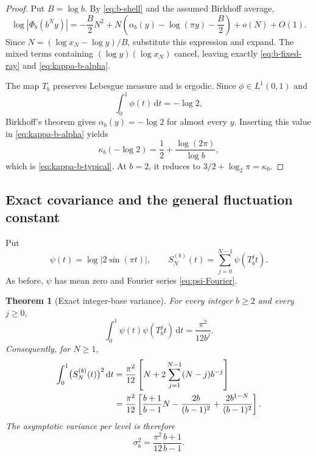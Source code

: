 \documentclass[11pt,oneside]{article}
\numberwithin{equation}{section}
\newtheorem{theorem}{Theorem}[section]
\theoremstyle{definition}
\theoremstyle{remark}
\newcommand{\dd}{\,\mathrm d}
\begin{document}
\begin{proof}
Put \(B=\log b\).  By \eqref{eq:b-shell} and the assumed Birkhoff average,
\[
 \log|\Phi_b(b^Ny)|
 =-\frac B2N^2
 +N\left(\alpha_b(y)-\log(\pi y)-\frac B2\right)+o(N)
 +O(1).
\]
Since \(N=(\log x_N-\log y)/B\), substitute this expression and expand.  The mixed terms
containing \((\log y)(\log x_N)\) cancel, leaving exactly
\eqref{eq:b-fixed-ray} and \eqref{eq:kappa-b-alpha}.

The map \(T_b\) preserves Lebesgue measure and is ergodic.  Since \(\phi\in L^1(0,1)\)
and
\[
 \int_0^1\phi(t)\dd t=-\log2,
\]
Birkhoff's theorem gives \(\alpha_b(y)=-\log2\) for almost every \(y\).  Inserting this
value in \eqref{eq:kappa-b-alpha} yields
\[
 \kappa_b(-\log2)
 =\frac12+\frac{\log(2\pi)}{\log b},
\]
which is \eqref{eq:kappa-b-typical}.  At \(b=2\), it reduces to
\(3/2+\log_2\pi=\kappa_0\).
\end{proof}

\subsection{Exact covariance and the general fluctuation constant}

Put
\begin{equation}
 \psi(t)=\log|2\sin(\pi t)|,
 \qquad
 S_N^{(b)}(t)=\sum_{j=0}^{N-1}\psi(T_b^jt).
 \label{eq:Snb}
\end{equation}
As before, \(\psi\) has mean zero and Fourier series
\eqref{eq:psi-Fourier}.

\begin{theorem}[Exact integer-base variance]
\label{thm:b-variance}
For every integer \(b\ge2\) and every \(j\ge0\),
\begin{equation}
 \int_0^1\psi(t)\psi(T_b^jt)\dd t
 =\frac{\pi^2}{12b^j}.
 \label{eq:b-covariance}
\end{equation}
Consequently, for \(N\ge1\),
\begin{align}
 \int_0^1\bigl(S_N^{(b)}(t)\bigr)^2\dd t
 &=\frac{\pi^2}{12}
 \left[N+2\sum_{j=1}^{N-1}(N-j)b^{-j}\right]\notag\\
 &=\frac{\pi^2}{12}
 \left[\frac{b+1}{b-1}N-\frac{2b}{(b-1)^2}
       +\frac{2b^{1-N}}{(b-1)^2}\right].
 \label{eq:b-variance}
\end{align}
The asymptotic variance per level is therefore
\begin{equation}
 \boxed{\displaystyle
 \sigma_b^2=\frac{\pi^2}{12}\frac{b+1}{b-1}.}
 \label{eq:sigma-b}
\end{equation}
\end{theorem}
\end{document}
